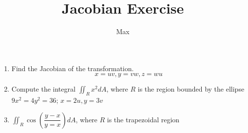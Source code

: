 


\title{Jacobian Exercise}

\author{Max}

\maketitle

\begin{enumerate}
	\item Find the Jacobian of the transformation.
	$$x = uv, y = vw, z = wu$$
	\item Compute the integral $\iint_R x^2 dA$, where $R$ is the region bounded by the ellipse $9x^2 = 4y^2 = 36$; $x = 2u,y = 3v$
	\item $\iint_R \cos \left(  \dfrac{y - x}{y = x} \right)dA$, where $R$ is the trapezoidal region
\end{enumerate}




